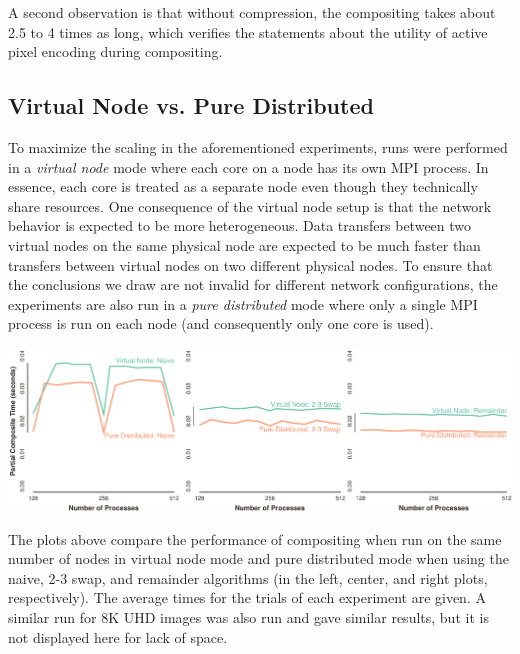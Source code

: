 \documentclass{vgtc}                          %
\newcommand*{\keyterm}[1]{\emph{#1}}
\newcommand*{\textalgorithm}[1]{\textsf{#1}\xspace}
\newcommand{\ttswap}{\textalgorithm{2-3 swap}}
\newcommand{\naive}{\textalgorithm{naive}}
\newcommand{\remainder}{\textalgorithm{remainder}}
\begin{document}
A second observation is that without compression, the compositing takes about 2.5 to 4 times as long, which verifies the statements about the utility of active pixel encoding during compositing.

\subsection{Virtual Node vs. Pure Distributed}
\label{sec:VNCompare}

To maximize the scaling in the aforementioned experiments, runs were performed in a \keyterm{virtual node} mode where each core on a node has its own MPI process.
In essence, each core is treated as a separate node even though they technically share resources.
One consequence of the virtual node setup is that the network behavior is expected to be more heterogeneous.
Data transfers between two virtual nodes on the same physical node are expected to be much faster than transfers between virtual nodes on two different physical nodes.
To ensure that the conclusions we draw are not invalid for different network configurations, the experiments are also run in a \keyterm{pure distributed} mode where only a single MPI process is run on each node (and consequently only one core is used).

\noindent
\includegraphics[width=\linewidth]{vn-vs-smp-hdtv}

The plots above compare the performance of compositing when run on the same number of nodes in virtual node mode and pure distributed mode when using the \naive, \ttswap, and \remainder algorithms (in the left, center, and right plots, respectively).
The average times for the trials of each experiment are given.
A similar run for 8K UHD images was also run and gave similar results, but it is not displayed here for lack of space.
\end{document}
